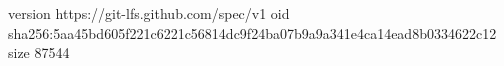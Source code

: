 version https://git-lfs.github.com/spec/v1
oid sha256:5aa45bd605f221c6221c56814dc9f24ba07b9a9a341e4ca14ead8b0334622c12
size 87544
